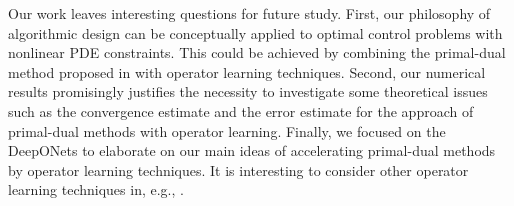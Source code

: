 \documentclass[final]{siamart171218}
\theoremstyle{remark}
\begin{document}
Our work leaves interesting questions for future study. First, our philosophy of algorithmic design can be conceptually applied to optimal control problems with nonlinear PDE constraints. This could be achieved by combining the primal-dual method proposed in \cite{valkonen2014primal} with operator learning techniques. Second, our numerical results promisingly justifies the necessity to investigate some theoretical issues such as the convergence estimate and the error estimate for the approach of primal-dual methods with operator learning. Finally, we focused on the DeepONets to elaborate on our main ideas of accelerating primal-dual methods by operator learning techniques. It is interesting to consider other operator learning techniques in, e.g., \cite{cao2023,li2020FNO,li2020GNO,wang2021}.



\newpage
\end{document}

